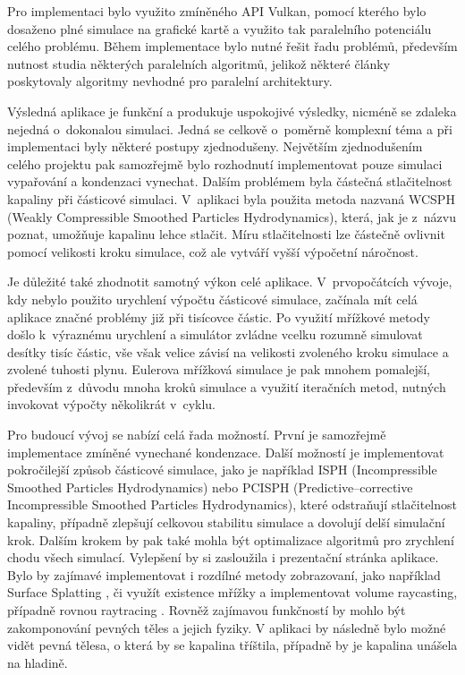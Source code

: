 Pro implementaci bylo využito zmíněného API Vulkan, pomocí kterého bylo dosaženo plné simulace na grafické kartě a využito tak paralelního potenciálu celého problému. Během implementace bylo nutné řešit řadu problémů, především nutnost studia některých paralelních algoritmů, jelikož některé články poskytovaly algoritmy nevhodné pro paralelní architektury.

Výsledná aplikace je funkční a produkuje uspokojivé výsledky, nicméně se zdaleka nejedná o~dokonalou simulaci. Jedná se celkově o~poměrně komplexní téma a při implementaci byly některé postupy zjednodušeny. Největším zjednodušením celého projektu pak samozřejmě bylo rozhodnutí implementovat pouze simulaci vypařování a kondenzaci vynechat. Dalším problémem byla částečná stlačitelnost kapaliny při částicové simulaci. V~aplikaci byla použita metoda nazvaná WCSPH (Weakly Compressible Smoothed Particles Hydrodynamics), která, jak je z~názvu poznat, umožňuje kapalinu lehce stlačit. Míru stlačitelnosti lze částečně ovlivnit pomocí velikosti kroku simulace, což ale vytváří vyšší výpočetní náročnost. 

Je důležité také zhodnotit samotný výkon celé aplikace. V~prvopočátcích vývoje, kdy nebylo použito urychlení výpočtu částicové simulace, začínala mít celá aplikace značné problémy již při tisícovce částic. Po využití mřížkové metody došlo k~výraznému urychlení a simulátor zvládne vcelku rozumně simulovat desítky tisíc částic, vše však velice závisí na velikosti zvoleného kroku simulace a zvolené tuhosti plynu. Eulerova mřížková simulace je pak mnohem pomalejší, především z~důvodu mnoha kroků simulace a využití iteračních metod, nutných invokovat výpočty několikrát v~cyklu.

Pro budoucí vývoj se nabízí celá řada možností. První je samozřejmě implementace zmíněné vynechané kondenzace. Další možností je implementovat pokročilejší způsob částicové simulace, jako je například ISPH (Incompressible Smoothed Particles Hydrodynamics) nebo PCISPH (Predictive–corrective Incompressible Smoothed Particles Hydrodynamics), které odstraňují stlačitelnost kapaliny, případně zlepšují celkovou stabilitu simulace a dovolují delší simulační krok. Dalším krokem by pak také mohla být optimalizace algoritmů pro zrychlení chodu všech simulací. Vylepšení by si zasloužila i prezentační stránka aplikace. Bylo by zajímavé implementovat i rozdílné metody zobrazovaní, jako například Surface Splatting \cite{surfSplat}, či využít existence mřížky a implementovat volume raycasting, případně rovnou raytracing \cite{volumeRT}. Rovněž zajímavou funkčností by mohlo být zakomponování pevných těles a jejich fyziky. V aplikaci by následně bylo možné vidět pevná tělesa, o která by se kapalina tříštila, případně by je kapalina unášela na hladině.




